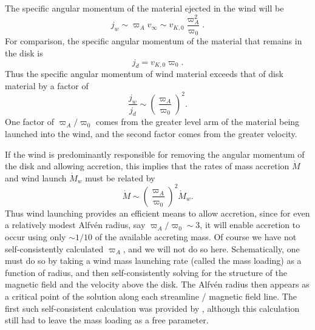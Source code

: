 The specific angular momentum of the material ejected in the wind will be
\begin{equation}
j_w \sim \varpi_A v_\infty \sim v_{K,0} \frac{\varpi_A^2}{\varpi_0}.
\end{equation}
For comparison, the specific angular momentum of the material that remains in the disk is
\begin{equation}
j_d = v_{K,0} \varpi_0.
\end{equation}
Thus the specific angular momentum of wind material exceeds that of disk material by a factor of
\begin{equation}
\frac{j_w}{j_d} \sim \left(\frac{\varpi_A}{\varpi_0}\right)^2.
\end{equation}
One factor of $\varpi_A/\varpi_0$ comes from the greater level arm of the material being launched into the wind, and the second factor comes from the greater velocity.

If the wind is predominantly responsible for removing the angular momentum of the disk and allowing accretion, this implies that the rates of mass accretion $\dot{M}$ and wind launch $\dot{M}_w$ must be related by
\begin{equation}
\dot{M} \sim \left(\frac{\varpi_A}{\varpi_0}\right)^2 \dot{M}_w.
\end{equation}
Thus wind launching provides an efficient means to allow accretion, since for even a relatively modest Alfv\'{e}n radius, say $\varpi_A/\varpi_0 \sim 3$, it will enable accretion to occur using only $\sim 1/10$ of the available accreting mass. Of course we have not self-consistently calculated $\varpi_A$, and we will not do so here. Schematically, one must do so by taking a wind mass launching rate (called the mass loading) as a function of radius, and then self-consistently solving for the structure of the magnetic field and the velocity above the disk. The Alfv\'{e}n radius then appears as a critical point of the solution along each streamline / magnetic field line. The first such self-consistent calculation was provided by \citet{blandford82a}, although this calculation still had to leave the mass loading as a free parameter.


